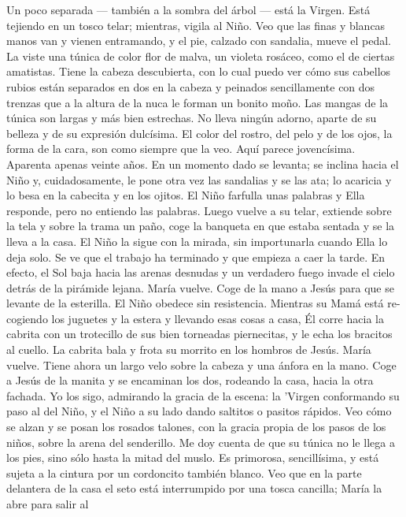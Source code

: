 \documentclass[12pt]{book} %
\begin{document}
Un poco separada — también a la sombra del árbol — está la Virgen. Está tejiendo en un tosco telar; mientras, vigila al Niño. Veo que las finas y blancas manos van y vienen entramando, y el pie, calzado con sandalia, mueve el pedal. La viste una túnica de color flor de malva, un violeta rosáceo, como el de ciertas amatistas. Tiene la cabeza descubierta, con lo cual puedo ver cómo sus cabellos rubios están separados en dos en la cabeza y peinados sencillamente con dos trenzas que a la altura de la nuca le forman un bonito moño. Las mangas de la túnica son largas y más bien estrechas. No lleva ningún adorno, aparte de su belleza y de su expresión dulcísima. El color del rostro, del pelo y de los ojos, la forma de la cara, son como siempre que la veo. Aquí parece jovencísima. Aparenta apenas veinte años.                            
En un momento dado se levanta; se inclina hacia el Niño y, cuidadosamente, le pone otra vez las sandalias y se las ata; 
lo acaricia y lo besa en la cabecita y en los ojitos. El Niño farfulla unas palabras y Ella responde, pero no entiendo las palabras. Luego vuelve a su telar, extiende sobre la tela y sobre la trama un paño, coge la banqueta en que estaba sentada y se la lleva a la casa. El Niño la sigue con la mirada, sin importunarla cuando Ella lo deja solo. 
Se ve que el trabajo ha terminado y que empieza a caer la tarde. En efecto, el Sol baja hacia las arenas desnudas y un 
verdadero fuego invade el cielo detrás de la pirámide lejana. 
María vuelve. Coge de la mano a Jesús para que se levante de la esterilla. El Niño obedece sin resistencia. Mientras su Mamá está re- cogiendo los juguetes y la estera y llevando esas cosas a casa, Él corre hacia la cabrita con un trotecillo de sus bien torneadas piernecitas, y le echa los bracitos al cuello. La cabrita bala y frota su morrito en los hombros de Jesús. 
María vuelve. Tiene ahora un largo velo sobre la cabeza y una ánfora en la mano. Coge a Jesús de la manita y se 
encaminan los dos, rodeando la casa, hacia la otra fachada. 
Yo los sigo, admirando la gracia de la escena: la 'Virgen conformando su paso al del Niño, y el Niño a su lado dando 
saltitos o pasitos rápidos. Veo cómo se alzan y se posan los rosados talones, con la gracia propia de los pasos de los niños, sobre la arena del senderillo. Me doy cuenta de que su túnica no le llega a los pies, sino sólo hasta la mitad del muslo. Es primorosa, sencillísima, y está sujeta a la cintura por un cordoncito también blanco. 
Veo que en la parte delantera de la casa el seto está interrumpido por una tosca cancilla; María la abre para salir al 
\end{document}
